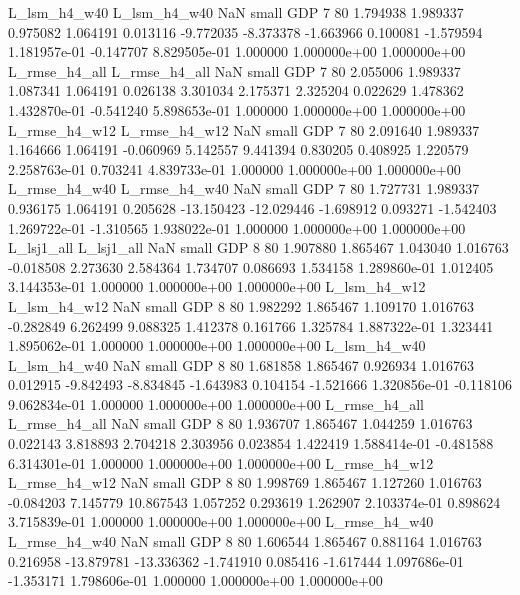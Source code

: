  L_lsm_h4_w40  L_lsm_h4_w40                   NaN      small      GDP                 7 80 1.794938       1.989337 0.975082       1.064191    0.013116     -9.772035     -8.373378    -1.663966       0.100081 -1.579594 1.181957e-01    -0.147707   8.829505e-01            1.000000    1.000000e+00        1.000000e+00
L_rmse_h4_all L_rmse_h4_all                   NaN      small      GDP                 7 80 2.055006       1.989337 1.087341       1.064191    0.026138      3.301034      2.175371     2.325204       0.022629  1.478362 1.432870e-01    -0.541240   5.898653e-01            1.000000    1.000000e+00        1.000000e+00
L_rmse_h4_w12 L_rmse_h4_w12                   NaN      small      GDP                 7 80 2.091640       1.989337 1.164666       1.064191   -0.060969      5.142557      9.441394     0.830205       0.408925  1.220579 2.258763e-01     0.703241   4.839733e-01            1.000000    1.000000e+00        1.000000e+00
L_rmse_h4_w40 L_rmse_h4_w40                   NaN      small      GDP                 7 80 1.727731       1.989337 0.936175       1.064191    0.205628    -13.150423    -12.029446    -1.698912       0.093271 -1.542403 1.269722e-01    -1.310565   1.938022e-01            1.000000    1.000000e+00        1.000000e+00
   L_lsj1_all    L_lsj1_all                   NaN      small      GDP                 8 80 1.907880       1.865467 1.043040       1.016763   -0.018508      2.273630      2.584364     1.734707       0.086693  1.534158 1.289860e-01     1.012405   3.144353e-01            1.000000    1.000000e+00        1.000000e+00
 L_lsm_h4_w12  L_lsm_h4_w12                   NaN      small      GDP                 8 80 1.982292       1.865467 1.109170       1.016763   -0.282849      6.262499      9.088325     1.412378       0.161766  1.325784 1.887322e-01     1.323441   1.895062e-01            1.000000    1.000000e+00        1.000000e+00
 L_lsm_h4_w40  L_lsm_h4_w40                   NaN      small      GDP                 8 80 1.681858       1.865467 0.926934       1.016763    0.012915     -9.842493     -8.834845    -1.643983       0.104154 -1.521666 1.320856e-01    -0.118106   9.062834e-01            1.000000    1.000000e+00        1.000000e+00
L_rmse_h4_all L_rmse_h4_all                   NaN      small      GDP                 8 80 1.936707       1.865467 1.044259       1.016763    0.022143      3.818893      2.704218     2.303956       0.023854  1.422419 1.588414e-01    -0.481588   6.314301e-01            1.000000    1.000000e+00        1.000000e+00
L_rmse_h4_w12 L_rmse_h4_w12                   NaN      small      GDP                 8 80 1.998769       1.865467 1.127260       1.016763   -0.084203      7.145779     10.867543     1.057252       0.293619  1.262907 2.103374e-01     0.898624   3.715839e-01            1.000000    1.000000e+00        1.000000e+00
L_rmse_h4_w40 L_rmse_h4_w40                   NaN      small      GDP                 8 80 1.606544       1.865467 0.881164       1.016763    0.216958    -13.879781    -13.336362    -1.741910       0.085416 -1.617444 1.097686e-01    -1.353171   1.798606e-01            1.000000    1.000000e+00        1.000000e+00